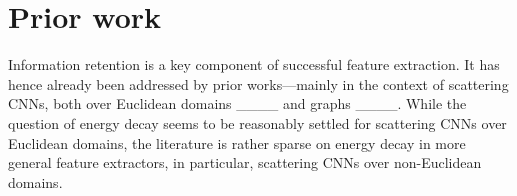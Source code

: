 \section{Prior work}
\label{sec: Prior work}

Information retention is a key %
component of successful feature extraction. It has hence already been addressed by prior works---mainly in the context of scattering CNNs, both over Euclidean domains ____ and graphs ____. While the question of energy decay seems to be reasonably settled for scattering CNNs over Euclidean domains, the literature is rather sparse on energy decay in more general feature extractors, in particular, scattering CNNs over non-Euclidean domains. %